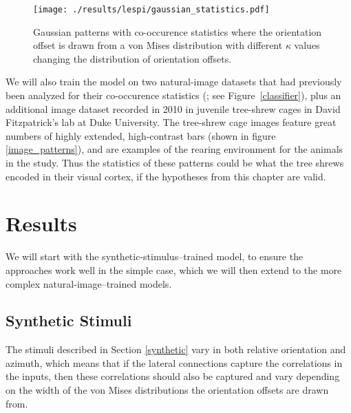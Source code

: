 \begin{figure}
	\centering
	\texttt{[image: ./results/lespi/gaussian\_statistics.pdf]}
	\caption[Example of Gaussian patterns with co-occurence
      statistics] {Gaussian patterns with co-occurence statistics
      where the orientation offset is drawn from a von Mises
      distribution with different $\kappa$ values changing the
      distribution of orientation offsets.}
    \label{GaussianStatistics}
\end{figure}

We will also train the model on two natural-image datasets that had
previously been analyzed for their co-occurence statistics
(\citealt{Perrinet2015}; see Figure~\ref{classifier}), plus an
additional image dataset recorded in 2010 in juvenile tree-shrew cages
in David Fitzpatrick's lab at Duke University.  The tree-shrew cage
images feature great numbers of highly extended, high-contrast bars
(shown in figure \ref{image_patterns}), and are examples of the
rearing environment for the animals in the \cite{Bosking1997} study.
Thus the statistics of these patterns could be what the
\cite{Bosking1997} tree shrews encoded in their visual cortex, if the
hypotheses from this chapter are valid.

\section{Results}

We will start with the synthetic-stimulus--trained model, to ensure
the approaches work well in the simple case, which we will then extend
to the more complex natural-image--trained models.

\subsection{Synthetic Stimuli}

The stimuli described in Section \ref{synthetic} vary in both relative
orientation and azimuth, which means that if the lateral connections
capture the correlations in the inputs, then these correlations should
also be captured and vary depending on the width of the von Mises
distributions the orientation offsets are drawn from.

